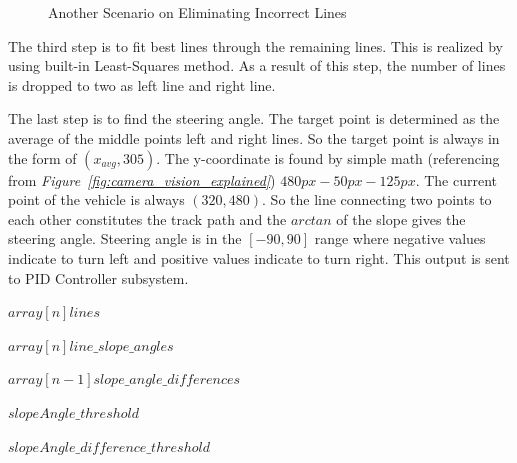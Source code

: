 \documentclass[a4paper,12pt]{article}
\begin{document}
\begin{enumerate}[A.]
\begin{figure}[t!]
\caption{\label{fig:dataP_explainedBroken} Another Scenario on Eliminating Incorrect Lines}

\end{figure}

The third step is to fit best lines through the remaining lines. This is realized by using built-in Least-Squares method. As a result of this step, the number of lines is dropped to two as left line and right line.


The last step is to find the steering angle. The target point is determined as the average of the middle points left and right lines. So the target point is always in the form of $(x_{avg}, 305)$. The y-coordinate is found by simple math (referencing from \textit{Figure~\ref{fig:camera_vision_explained}}) $480px-50px-125px$. The current point of the vehicle is always $(320,480)$. So the line connecting two points to each other constitutes the track path and the $arctan$ of the slope gives the steering angle. Steering angle is in the $[-90,90]$ range where negative values indicate to turn left and positive values indicate to turn right. This output is sent to PID Controller subsystem.
\begin{algorithm}[t]
	
	
	
	\DontPrintSemicolon
	
	
	$array[n] lines $\;
	
	$array[n] line\_slope\_angles $\;
	
	$array[n-1] slope\_angle\_differences$ \;
	
	
	$slopeAngle\_threshold $\;
	
	$slopeAngle\_difference\_threshold$ \;
	
	
	
\end{algorithm}
\end{enumerate}
\end{document}
